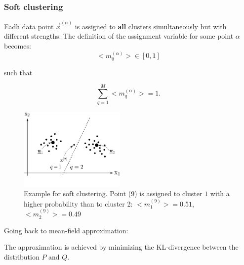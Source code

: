 \begin{frame}
\frametitle{Soft clustering}
Eadh data point $\vec x^{(\alpha)}$ is assigned to \textbf{all} clusters simultaneously but with different strengths:
The definition of the assignment variable for some point $\alpha$ becomes:
\begin{equation}
\label{eq:assignvarsoft}
\big< m_q^{(\alpha)} \big> \in [0, 1]
\end{equation}

such that

\begin{equation}
\label{eq:assignvarsoftnormalize}
\sum_{q=1}^{M}\big< m_q^{(\alpha)} \big> = 1.
\end{equation}

\begin{figure}[h!]
  \centering
\includegraphics[height=4cm]{img/clustering_soft} 
  \caption{Example for soft clustering. Point (9) is assigned to cluster $1$ with a higher probability than to cluster 2: $\big< m_1^{(9)} \big> = 0.51$, $\big< m_2^{(9)} \big> = 0.49$}
  \label{fig:clusteringsoft}
\end{figure}
\end{frame}

Going back to mean-field approximation:

The approximation is achieved by minimizing the KL-divergence between the distribution $P$ and $Q$. 

